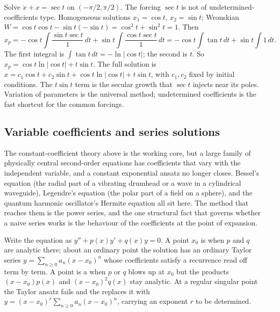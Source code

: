 Solve $\ddot{x} + x = \sec t$ on $(-\pi/2, \pi/2)$. The forcing
$\sec t$ is not of undetermined-coefficients type. Homogeneous
solutions $x_{1} = \cos t$, $x_{2} = \sin t$; Wronskian
$W = \cos t \cos t - \sin t (-\sin t) = \cos^{2} t + \sin^{2} t = 1$.
Then
\[
x_{p} = -\cos t \int \frac{\sin t \sec t}{1}\,dt + \sin t \int
\frac{\cos t \sec t}{1}\,dt = -\cos t \int \tan t\,dt + \sin t
\int 1\,dt.
\]
The first integral is $\int \tan t\,dt = -\ln|\cos t|$; the second
is $t$. So $x_{p} = \cos t \ln|\cos t| + t \sin t$. The full solution
is $x = c_{1} \cos t + c_{2} \sin t + \cos t \ln|\cos t| + t \sin t$,
with $c_{1}, c_{2}$ fixed by initial conditions. The $t \sin t$ term
is the secular growth that $\sec t$ injects near its poles. Variation
of parameters is the universal method; undetermined coefficients is
the fast shortcut for the common forcings.

\subsection{Variable coefficients and series solutions}

The constant-coefficient theory above is the working core, but a
large family of physically central second-order equations has
coefficients that vary with the independent variable, and a constant
exponential ansatz no longer closes. Bessel's equation (the radial
part of a vibrating drumhead or a wave in a cylindrical waveguide),
Legendre's equation (the polar part of a field on a sphere), and the
quantum harmonic oscillator's Hermite equation all sit here. The
method that reaches them is the power series, and the one structural
fact that governs whether a naive series works is the behaviour of the
coefficients at the point of expansion.

Write the equation as $y'' + p(x) y' + q(x) y = 0$. A point $x_{0}$ is
 when $p$ and $q$ are analytic there; about an
ordinary point the solution has an ordinary Taylor series
$y = \sum_{n \geq 0} a_{n}(x - x_{0})^{n}$ whose coefficients satisfy a
recurrence read off term by term. A point is a  when $p$ or $q$ blows up at $x_{0}$ but the products
$(x - x_{0})p(x)$ and $(x - x_{0})^{2}q(x)$ stay analytic. At a regular
singular point the Taylor ansatz fails and the  replaces it with $y = (x - x_{0})^{r}\sum_{n \geq 0}
a_{n}(x - x_{0})^{n}$, carrying an exponent $r$ to be determined.

